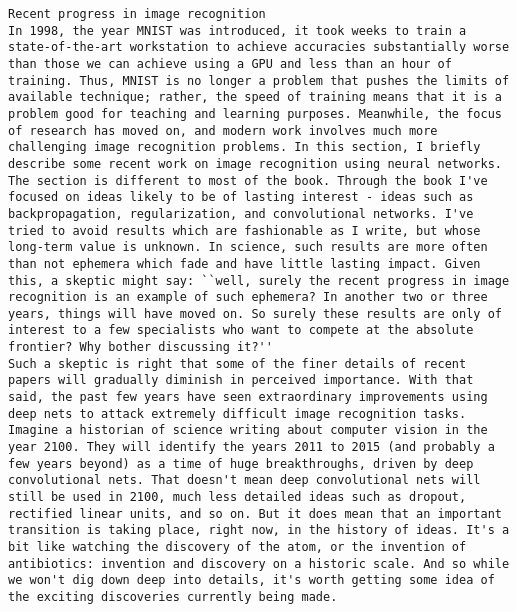 \begin{lstlisting}
Recent progress in image recognition
In 1998, the year MNIST was introduced, it took weeks to train a state-of-the-art workstation to achieve accuracies substantially worse than those we can achieve using a GPU and less than an hour of training. Thus, MNIST is no longer a problem that pushes the limits of available technique; rather, the speed of training means that it is a problem good for teaching and learning purposes. Meanwhile, the focus of research has moved on, and modern work involves much more challenging image recognition problems. In this section, I briefly describe some recent work on image recognition using neural networks.
The section is different to most of the book. Through the book I've focused on ideas likely to be of lasting interest - ideas such as backpropagation, regularization, and convolutional networks. I've tried to avoid results which are fashionable as I write, but whose long-term value is unknown. In science, such results are more often than not ephemera which fade and have little lasting impact. Given this, a skeptic might say: ``well, surely the recent progress in image recognition is an example of such ephemera? In another two or three years, things will have moved on. So surely these results are only of interest to a few specialists who want to compete at the absolute frontier? Why bother discussing it?''
Such a skeptic is right that some of the finer details of recent papers will gradually diminish in perceived importance. With that said, the past few years have seen extraordinary improvements using deep nets to attack extremely difficult image recognition tasks. Imagine a historian of science writing about computer vision in the year 2100. They will identify the years 2011 to 2015 (and probably a few years beyond) as a time of huge breakthroughs, driven by deep convolutional nets. That doesn't mean deep convolutional nets will still be used in 2100, much less detailed ideas such as dropout, rectified linear units, and so on. But it does mean that an important transition is taking place, right now, in the history of ideas. It's a bit like watching the discovery of the atom, or the invention of antibiotics: invention and discovery on a historic scale. And so while we won't dig down deep into details, it's worth getting some idea of the exciting discoveries currently being made.

\end{lstlisting}
